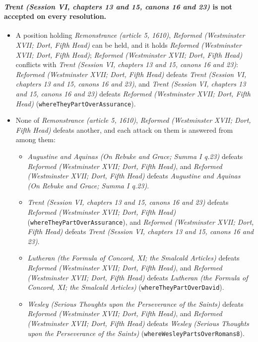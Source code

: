 \documentclass[11pt]{article}
\begin{document}
\paragraph{\emph{Trent (Session VI, chapters 13 and 15, canons 16 and 23)} is not accepted on every resolution.}
\begin{itemize}
\item A position holding \emph{Remonstrance (article 5, 1610)}, \emph{Reformed (Westminster XVII; Dort, Fifth Head)} can be held, and it holds \emph{Reformed (Westminster XVII; Dort, Fifth Head)}; \emph{Reformed (Westminster XVII; Dort, Fifth Head)} conflicts with \emph{Trent (Session VI, chapters 13 and 15, canons 16 and 23)}: \emph{Reformed (Westminster XVII; Dort, Fifth Head)} defeats \emph{Trent (Session VI, chapters 13 and 15, canons 16 and 23)}, and \emph{Trent (Session VI, chapters 13 and 15, canons 16 and 23)} defeats \emph{Reformed (Westminster XVII; Dort, Fifth Head)} (\texttt{where\allowbreak{}They\allowbreak{}Part\allowbreak{}Over\allowbreak{}Assurance}).
\item None of \emph{Remonstrance (article 5, 1610)}, \emph{Reformed (Westminster XVII; Dort, Fifth Head)} defeats another, and each attack on them is answered from among them:
\begin{itemize}
\item \emph{Augustine and Aquinas (On Rebuke and Grace; Summa I q.23)} defeats \emph{Reformed (Westminster XVII; Dort, Fifth Head)}, and \emph{Reformed (Westminster XVII; Dort, Fifth Head)} defeats \emph{Augustine and Aquinas (On Rebuke and Grace; Summa I q.23)}.
\item \emph{Trent (Session VI, chapters 13 and 15, canons 16 and 23)} defeats \emph{Reformed (Westminster XVII; Dort, Fifth Head)} (\texttt{where\allowbreak{}They\allowbreak{}Part\allowbreak{}Over\allowbreak{}Assurance}), and \emph{Reformed (Westminster XVII; Dort, Fifth Head)} defeats \emph{Trent (Session VI, chapters 13 and 15, canons 16 and 23)}.
\item \emph{Lutheran (the Formula of Concord, XI; the Smalcald Articles)} defeats \emph{Reformed (Westminster XVII; Dort, Fifth Head)}, and \emph{Reformed (Westminster XVII; Dort, Fifth Head)} defeats \emph{Lutheran (the Formula of Concord, XI; the Smalcald Articles)} (\texttt{where\allowbreak{}They\allowbreak{}Part\allowbreak{}Over\allowbreak{}David}).
\item \emph{Wesley (Serious Thoughts upon the Perseverance of the Saints)} defeats \emph{Reformed (Westminster XVII; Dort, Fifth Head)}, and \emph{Reformed (Westminster XVII; Dort, Fifth Head)} defeats \emph{Wesley (Serious Thoughts upon the Perseverance of the Saints)} (\texttt{where\allowbreak{}Wesley\allowbreak{}Parts\allowbreak{}Over\allowbreak{}Romans8}).
\end{itemize}
\end{itemize}
\end{document}
